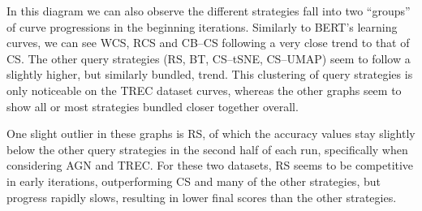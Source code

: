 \documentclass[english,bachelor,ul]{webisthesis} %
\begin{document}
In this diagram we can also observe the different strategies fall into two ``groups'' of curve progressions in the beginning iterations. Similarly to BERT's learning curves, we can see WCS, RCS and CB--CS following a very close trend to that of CS. The other query strategies (RS, BT, CS--tSNE, CS--UMAP) seem to follow a slightly higher, but similarly bundled, trend. This clustering of query strategies is only noticeable on the TREC dataset curves, whereas the other graphs seem to show all or most strategies bundled closer together overall.

One slight outlier in these graphs is RS, of which the accuracy values stay slightly below the other query strategies in the second half of each run, specifically when considering AGN and TREC. For these two datasets, RS seems to be competitive in early iterations, outperforming CS and many of the other strategies, but progress rapidly slows, resulting in lower final scores than the other strategies.


\clearpage \newpage
\end{document}
